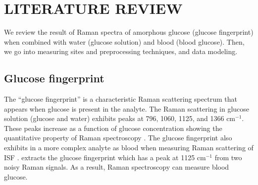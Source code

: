 \setlength{\footskip}{8mm}

\chapter{LITERATURE REVIEW}\label{literatureReview}

We review the result of Raman spectra of amorphous glucose (glucose fingerprint) when combined with water (glucose solution) and blood (blood glucose). 
Then, we go into measuring sites and preprocessing techniques, and data modeling.







\section{Glucose fingerprint}

The ``glucose fingerprint'' is a characteristic Raman scattering spectrum that appears when glucose is present in the analyte.
The Raman scattering in glucose solution (glucose and water) exhibits peaks at 796, 1060, 1125, and 1366 $\text{cm}^{-1}$.
These peaks increase as a function of glucose concentration showing the quantitative property of Raman spectroscopy \citep{solutionGlucose}.
The glucose fingerprint also exhibits in a more complex analyte as blood when measuring Raman scattering of ISF \citep{forearm2005, forearm2014, directGlucose, sitecompare}.
\cite{directGlucose} extracts the glucose fingerprint which has a peak at 1125 $\text{cm}^{-1}$ from two noisy Raman signals.
As a result, Raman spectroscopy can measure blood glucose.

